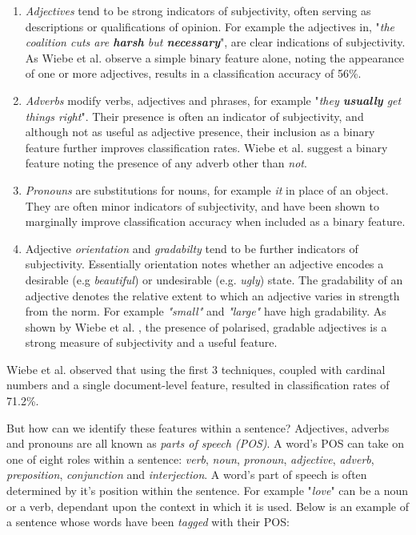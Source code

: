 \begin{enumerate}
	
	\item \emph{Adjectives} tend to be strong indicators of subjectivity, often serving as descriptions or qualifications of opinion. For example the adjectives in, "\emph{the coalition cuts are \textbf{harsh} but \textbf{necessary}}", are clear indications of subjectivity. As Wiebe et al. \cite{Wiebe:1999cj} observe a simple binary feature alone, noting the appearance of one or more adjectives, results in a classification accuracy of 56\%. 
	
	\item \emph{Adverbs} modify verbs, adjectives and phrases, for example "\emph{they \textbf{usually} get things right}". Their presence is often an indicator of subjectivity, and although not as useful as adjective presence, their inclusion as a binary feature further improves classification rates. Wiebe et al. \cite{Wiebe:1999cj} suggest a binary feature noting the presence of any adverb other than \emph{not}.
	
	\item \emph{Pronouns} are substitutions for nouns, for example \emph{it} in place of an object. They are often minor indicators of subjectivity, and have been shown to marginally improve classification accuracy when included as a binary feature.
		
	\item Adjective \emph{orientation} and \emph{gradabilty} tend to be further indicators of subjectivity. Essentially orientation notes whether an adjective encodes a desirable (e.g \emph{beautiful}) or undesirable (e.g. \emph{ugly}) state. The gradability of an adjective denotes the relative extent to which an adjective varies in strength from the norm. For example \emph{"small"} and \emph{"large"} have high gradability. As shown by Wiebe et al. \cite{Wiebe:2000tk}, the presence of polarised, gradable adjectives is a strong measure of subjectivity and a useful feature.
	
\end{enumerate}

Wiebe et al. \cite{Wiebe:1999cj} observed that using the first 3 techniques, coupled with cardinal numbers and a single document-level feature, resulted in classification rates of 71.2\%. 

But how can we identify these features within a sentence? Adjectives, adverbs and pronouns are all known as \emph{parts of speech (POS)}. A word's POS can take on one of eight roles within a sentence: \emph{verb}, \emph{noun}, \emph{pronoun}, \emph{adjective}, \emph{adverb}, \emph{preposition}, \emph{conjunction} and \emph{interjection}. A word's part of speech is often determined by it's position within the sentence. For example "\emph{love}" can be a noun or a verb, dependant upon the context in which it is used. Below is an example of a sentence whose words have been \emph{tagged} with their POS:

